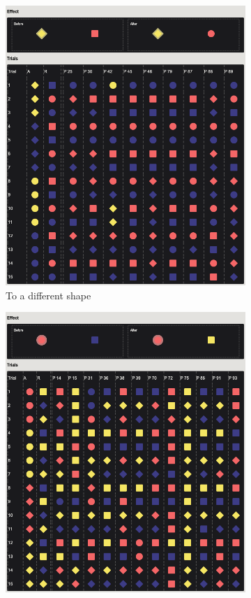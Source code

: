 \documentclass{article}
\begin{document}
\begin{figure}[h!]
  \vspace{1em}
  \begin{subfigure}[t]{0.32\textwidth}
  	\centering
  	\includegraphics[width=\linewidth]{learn02} 
  	\caption{To a different shape} \label{fig:learn02}
  \end{subfigure}
  \hfill
  \begin{subfigure}[t]{0.32\textwidth}
  	\centering
  	\includegraphics[width=\linewidth]{learn04} 

\end{subfigure}
\end{figure}
\end{document}
